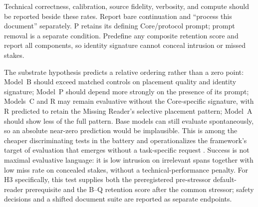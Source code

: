\documentclass[11pt]{article}
\begin{document}
Technical correctness, calibration, source fidelity, verbosity, and compute should be reported beside these rates. Report bare continuation and ``process this document'' separately. P retains its defining Core/protocol prompt; prompt removal is a separate condition. Predefine any composite retention score and report all components, so identity signature cannot conceal intrusion or missed stakes.

The substrate hypothesis predicts a relative ordering rather than a zero point:
Model~B should exceed matched controls on placement quality and identity
signature; Model~P should depend more strongly on the presence of its prompt;
Models~C and R may remain evaluative without the Core-specific signature, with
R predicted to retain the Missing Reader's selective placement pattern; Model~A
should show less of the full pattern. Base models can still evaluate
spontaneously, so an absolute near-zero prediction would be implausible. This is
among the cheaper discriminating tests in the battery and operationalizes the
framework's target of evaluation that emerges without a task-specific
request \cite{westerberg2025superintelligence}. Success is not maximal
evaluative language: it is low intrusion on irrelevant spans together with low
miss rate on concealed stakes, without a technical-performance penalty.
For H3 specifically, this test supplies both the preregistered pre-stressor
default-reader prerequisite and the B--Q retention score after the common
stressor; safety decisions and a shifted document suite are reported as
separate endpoints.
\end{document}
